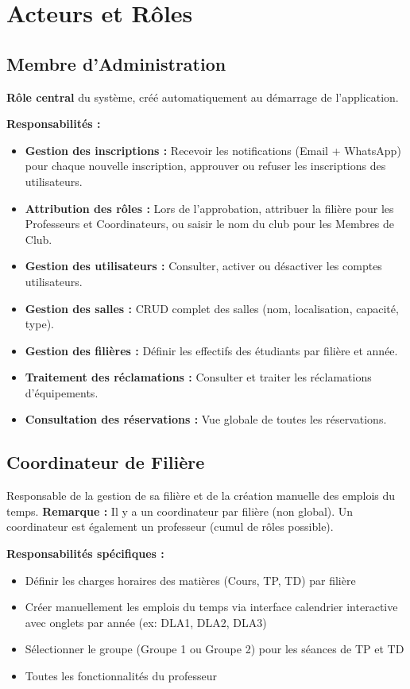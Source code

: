 \documentclass[12pt,a4paper]{article}
\begin{document}
\section{Acteurs et Rôles}

\subsection{Membre d'Administration}
\textbf{Rôle central} du système, créé automatiquement au démarrage de l'application.

\textbf{Responsabilités :}
\begin{itemize}
    \item \textbf{Gestion des inscriptions :} Recevoir les notifications (Email + WhatsApp) pour chaque nouvelle inscription, approuver ou refuser les inscriptions des utilisateurs.
    \item \textbf{Attribution des rôles :} Lors de l'approbation, attribuer la filière pour les Professeurs et Coordinateurs, ou saisir le nom du club pour les Membres de Club.
    \item \textbf{Gestion des utilisateurs :} Consulter, activer ou désactiver les comptes utilisateurs.
    \item \textbf{Gestion des salles :} CRUD complet des salles (nom, localisation, capacité, type).
    \item \textbf{Gestion des filières :} Définir les effectifs des étudiants par filière et année.
    \item \textbf{Traitement des réclamations :} Consulter et traiter les réclamations d'équipements.
    \item \textbf{Consultation des réservations :} Vue globale de toutes les réservations.
\end{itemize}

\subsection{Coordinateur de Filière}
Responsable de la gestion de sa filière et de la création manuelle des emplois du temps. \textbf{Remarque :} Il y a un coordinateur par filière (non global). Un coordinateur est également un professeur (cumul de rôles possible).

\textbf{Responsabilités spécifiques :}
\begin{itemize}
    \item Définir les charges horaires des matières (Cours, TP, TD) par filière
    \item Créer manuellement les emplois du temps via interface calendrier interactive avec onglets par année (ex: DLA1, DLA2, DLA3)
    \item Sélectionner le groupe (Groupe 1 ou Groupe 2) pour les séances de TP et TD
    \item Toutes les fonctionnalités du professeur
\end{itemize}
\end{document}
